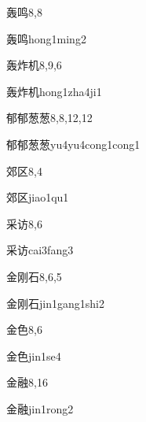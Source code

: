 \begin{entry}{轰鸣}{8,8}
  \begin{phonetics}{轰鸣}{hong1ming2}
  \end{phonetics}
\end{entry}

\begin{entry}{轰炸机}{8,9,6}
  \begin{phonetics}{轰炸机}{hong1zha4ji1}
  \end{phonetics}
\end{entry}

\begin{entry}{郁郁葱葱}{8,8,12,12}
  \begin{phonetics}{郁郁葱葱}{yu4yu4cong1cong1}
  \end{phonetics}
\end{entry}

\begin{entry}{郊区}{8,4}
  \begin{phonetics}{郊区}{jiao1qu1}
  \end{phonetics}
\end{entry}

\begin{entry}{采访}{8,6}
  \begin{phonetics}{采访}{cai3fang3}
  \end{phonetics}
\end{entry}

\begin{entry}{金刚石}{8,6,5}
  \begin{phonetics}{金刚石}{jin1gang1shi2}
  \end{phonetics}
\end{entry}

\begin{entry}{金色}{8,6}
  \begin{phonetics}{金色}{jin1se4}
  \end{phonetics}
\end{entry}

\begin{entry}{金融}{8,16}
  \begin{phonetics}{金融}{jin1rong2}
  \end{phonetics}
\end{entry}

